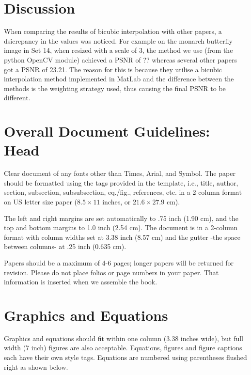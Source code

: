 \documentclass[letterpaper,twocolumn,fleqn]{article}
\begin{document}
\section{Discussion}

When comparing the results of bicubic interpolation with other papers, a dsicrepancy in the values was
noticed. For example on the monarch butterfly image in Set 14, when resized with a scale of 3, the method we use (from
the python OpenCV module) achieved a PSNR of ?? whereas several other papers got  a PSNR of 23.21.
The reason for this is because they utilise a bicubic interpolation method implemented in MatLab and the difference between the methods is the weighting strategy used, thus causing the final PSNR to be different.



\section{Overall Document Guidelines: Head}
\label{sec:intro}

Clear document of any fonts other than Times, Arial, and Symbol. The
paper should be formatted using the tags provided in the template,
i.e., title, author, section, subsection, subsubsection, eq./fig.,
references, etc.  in a 2 column format on US letter size paper ($8.5
\times 11$ inches, or $21.6 \times 27.9$ cm).

The left and right margins are set automatically to .75 inch (1.90 cm),
and the top and bottom margins to 1.0 inch (2.54 cm). The document is in
a 2-column format with column widths set at 3.38 inch (8.57 cm) and the
gutter -the space between columns- at .25 inch (0.635 cm).

Papers should be a maximum of 4-6 pages; longer papers will be
returned for revision. Please do not place folios or page numbers in
your paper. That information is inserted when we assemble the book.


\section{Graphics and Equations}
Graphics and equations should fit within one column (3.38 inches
wide), but full width (7 inch) figures are also acceptable. Equations,
figures and figure captions each have their own style tags. Equations
are numbered using parentheses flushed right as shown below.
\end{document}
